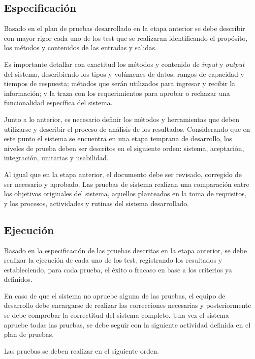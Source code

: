 \subsection{Especificación}

Basado en el plan de pruebas desarrollado en la etapa anterior se debe describir con mayor rigor cada uno de los test que se realizaran identificando el propósito, los métodos y contenidos de las entradas y salidas.

Es importante detallar con exactitud los métodos y contenido de \emph{input} y \emph{output} del sistema, describiendo los tipos y volúmenes de datos; rangos de capacidad y tiempos de respuesta; métodos que serán utilizados para ingresar y recibir la información; y la traza con los requerimientos para aprobar o rechazar una funcionalidad específica del sistema.

Junto a lo anterior, es necesario definir los métodos y herramientas que deben utilizarse y describir el proceso de análisis de los resultados.
Considerando que en este punto el sistema se encuentra en una etapa temprana de desarrollo, los niveles de prueba deben ser descritos en el siguiente orden: sistema, aceptación, integración, unitarias y usabilidad.

Al igual que en la etapa anterior, el documento debe ser revisado, corregido de ser necesario y aprobado. 
Las pruebas de sistema realizan una comparación entre los objetivos originales del sistema, aquellos planteados en la toma de requisitos, y los procesos, actividades y rutinas del sistema desarrollado.

\subsection{Ejecución}

Basado en la especificación de las pruebas descritas en la etapa anterior, se debe realizar la ejecución de cada uno de los test, registrando los resultados y estableciendo, para cada prueba, el éxito o fracaso en base a los criterios ya definidos. 

En caso de que el sistema no apruebe alguna de las pruebas, el equipo de desarrollo debe encargarse de realizar las correcciones necesarias y posteriormente se debe comprobar la correctitud del sistema completo. 
Una vez el sistema apruebe todas las pruebas, se debe seguir con la siguiente actividad definida en el plan de pruebas. 

Las pruebas se deben realizar en el siguiente orden.

